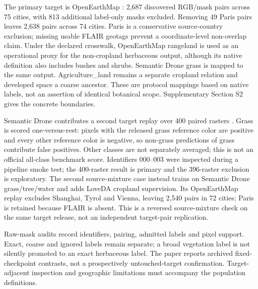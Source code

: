 The primary target is OpenEarthMap \citep{xia2023openearthmap}: 2,687 discovered RGB/mask pairs across 75 cities, with 813 additional label-only masks excluded. Removing 49 Paris pairs leaves 2,638 pairs across 74 cities. Paris is a conservative source-country exclusion; missing usable FLAIR geotags prevent a coordinate-level non-overlap claim. Under the declared crosswalk, OpenEarthMap rangeland is used as an operational proxy for the non-cropland herbaceous output, although its native definition also includes bushes and shrubs. Semantic Drone grass is mapped to the same output. Agriculture\_land remains a separate cropland relation and developed space a coarse ancestor. These are protocol mappings based on native labels, not an assertion of identical botanical scope. Supplementary Section S2 gives the concrete boundaries.

Semantic Drone contributes a second target replay over 400 paired rasters \citep{tugraz2018semanticdrone}. Grass is scored one-versus-rest: pixels with the released grass reference color are positive and every other reference color is negative, so non-grass predictions of grass contribute false positives. Other classes are not separately averaged; this is not an official all-class benchmark score. Identifiers 000--003 were inspected during a pipeline smoke test; the 400-raster result is primary and the 396-raster exclusion is exploratory. The second source-mixture case instead trains on Semantic Drone grass/tree/water and adds LoveDA cropland supervision. Its OpenEarthMap replay excludes Shanghai, Tyrol and Vienna, leaving 2,540 pairs in 72 cities; Paris is retained because FLAIR is absent. This is a reversed source-mixture check on the same target release, not an independent target-pair replication.

Raw-mask audits record identifiers, pairing, admitted labels and pixel support. Exact, coarse and ignored labels remain separate; a broad vegetation label is not silently promoted to an exact herbaceous label. The paper reports archived fixed-checkpoint contrasts, not a prospectively untouched-target confirmation. Target-adjacent inspection and geographic limitations must accompany the population definitions.

